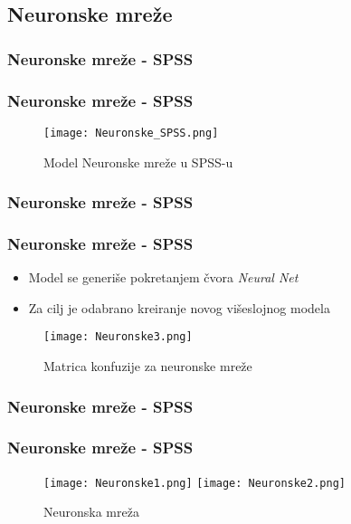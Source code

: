 \documentclass{beamer}
\begin{document}
\subsection{Neuronske mreže}
\subsubsection*{Neuronske mreže - SPSS}
\begin{frame}[fragile]
\frametitle{Neuronske mreže - SPSS}

\begin{figure}
\begin{center}
\texttt{[image: Neuronske\_SPSS.png]}
\caption{Model Neuronske mreže u SPSS-u}
\end{center}
\end{figure}
\end{frame}

\subsubsection*{Neuronske mreže - SPSS}
\begin{frame}[fragile]
\frametitle{Neuronske mreže - SPSS}
\begin{itemize}
\item Model se generiše pokretanjem čvora \textit{Neural Net}
\item Za cilj je odabrano kreiranje novog višeslojnog modela
\end{itemize}
\begin{figure}[ht!]
    \centering
    \texttt{[image: Neuronske3.png]}
    \caption{Matrica konfuzije za neuronske mreže}
    \label{fig:Neuronske3}
\end{figure}
\end{frame}

\subsubsection*{Neuronske mreže - SPSS}
\begin{frame}[fragile]
\frametitle{Neuronske mreže - SPSS}

\begin{figure}[ht!]
    \centering
    \texttt{[image: Neuronske1.png]}
    \texttt{[image: Neuronske2.png]}
    \caption{Neuronska mreža}
    \label{fig:Neuronske1}
\end{figure}
\end{frame}
\end{document}
